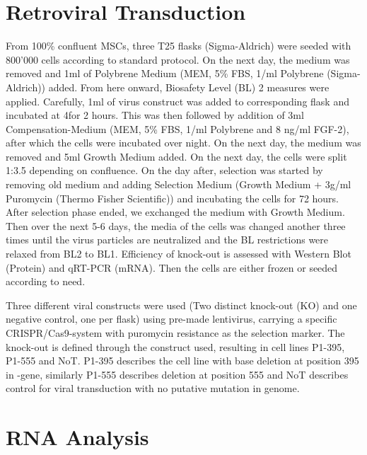 \section{Retroviral Transduction}
\label{sec:RetroVir}
From 100\% confluent MSCs, three T25 flasks (Sigma-Aldrich) were seeded with 800'000 cells according to standard protocol. On the next day, the medium was removed and 1ml of Polybrene Medium (MEM\textalpha{}, 5\% FBS, 1\mul{}/ml Polybrene (Sigma-Aldrich)) added. From here onward, Biosafety Level (BL) 2 measures were applied. Carefully, 1ml of virus construct was added to corresponding flask and incubated at 4\degC for 2 hours. This was then followed by addition of 3ml Compensation-Medium (MEM\textalpha{}, 5\% FBS, 1\mul{}/ml Polybrene and 8 ng/ml FGF-2), after which the cells were incubated over night. On the next day, the medium was removed and 5ml Growth Medium added. On the next day, the cells were split 1:3.5 depending on confluence. On the day after, selection was started by removing old medium and adding Selection Medium (Growth Medium + 3\textmu{}g/ml Puromycin (Thermo Fisher Scientific)) and incubating the cells for 72 hours. After selection phase ended, we exchanged the medium with Growth Medium. Then over the next 5-6 days, the media of the cells was changed another three times until the virus particles are neutralized and the BL restrictions were relaxed from BL2 to BL1. Efficiency of knock-out is  assessed with Western Blot (Protein) and qRT-PCR (mRNA). Then the cells are either frozen or seeded according to need. 

Three different viral constructs were used (Two distinct \Piezo{} knock-out (KO) and one negative control, one per flask) using pre-made lentivirus, carrying a specific CRISPR/Cas9-system with puromycin resistance as the selection marker. The knock-out is defined through the construct used, resulting in cell lines P1-395, P1-555 and NoT. P1-395 describes the cell line with base deletion at position 395 in \PiezoGene{}-gene, similarly P1-555 describes deletion at position 555 and NoT describes control for viral transduction with no putative mutation in genome.


\section{RNA Analysis}
